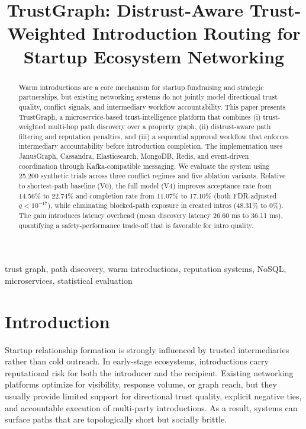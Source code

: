 \documentclass[conference]{IEEEtran}
\begin{document}
\title{TrustGraph: Distrust-Aware Trust-Weighted Introduction Routing for Startup Ecosystem Networking}

\author{
}

\maketitle

\begin{abstract}
Warm introductions are a core mechanism for startup fundraising and strategic partnerships, but existing networking systems do not jointly model directional trust quality, conflict signals, and intermediary workflow accountability. This paper presents TrustGraph, a microservice-based trust-intelligence platform that combines (i) trust-weighted multi-hop path discovery over a property graph, (ii) distrust-aware path filtering and reputation penalties, and (iii) a sequential approval workflow that enforces intermediary accountability before introduction completion. The implementation uses JanusGraph, Cassandra, Elasticsearch, MongoDB, Redis, and event-driven coordination through Kafka-compatible messaging. We evaluate the system using 25,200 synthetic trials across three conflict regimes and five ablation variants. Relative to shortest-path baseline (V0), the full model (V4) improves acceptance rate from 14.56\% to 22.74\% and completion rate from 11.07\% to 17.10\% (both FDR-adjusted $q < 10^{-17}$), while eliminating blocked-path exposure in created intros (48.31\% to 0\%). The gain introduces latency overhead (mean discovery latency 26.60 ms to 36.11 ms), quantifying a safety-performance trade-off that is favorable for intro quality.
\end{abstract}

\begin{IEEEkeywords}
trust graph, path discovery, warm introductions, reputation systems, NoSQL, microservices, statistical evaluation
\end{IEEEkeywords}

\section{Introduction}
Startup relationship formation is strongly influenced by trusted intermediaries rather than cold outreach. In early-stage ecosystems, introductions carry reputational risk for both the introducer and the recipient. Existing networking platforms optimize for visibility, response volume, or graph reach, but they usually provide limited support for directional trust quality, explicit negative ties, and accountable execution of multi-party introductions. As a result, systems can surface paths that are topologically short but socially brittle.
\end{document}
